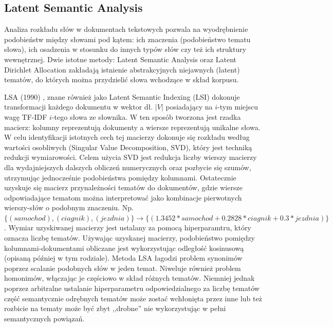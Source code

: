 \documentclass[pl]{minipw} %
\begin{document}
\subsection{Latent Semantic Analysis}
Analiza rozkładu słów w dokumentach tekstowych pozwala na wyodrębnienie podobieństw między słowami pod kątem: ich znaczenia (podobieństwo tematu słowa), ich osadzenia w stosunku do innych typów słów czy też ich struktury wewnętrznej. Dwie istotne metody: Latent Semantic Analysis\cite{lsa} oraz Latent Dirichlet Allocation\cite{lda} zakładają istnienie abstrakcyjnych niejawnych (latent) tematów, do których można przydzielić słowa wchodzące w skład korpusu.

LSA (1990) \cite{lsa}, znane również jako Latent Semantic Indexing (LSI) dokonuje transformacji każdego dokumentu w wektor dł. $|V|$ posiadający na $i$-tym miejscu wagę TF-IDF $i$-tego słowa ze słownika. W ten sposób tworzona jest rzadka macierz: kolumny reprezentują dokumenty a wiersze reprezentują unikalne słowa. W celu identyfikacji istotnych cech tej macierzy dokonuje się rozkładu według wartości osobliwych (Singular Value Decomposition\cite{svd}, SVD), który jest techniką redukcji wymiarowości. Celem użycia SVD jest redukcja liczby wierszy macierzy dla wydajniejszych dalszych obliczeń numerycznych oraz pozbycie się szumów, utrzymując jednocześnie podobieństwa pomiędzy kolumnami. Ostatecznie uzyskuje się macierz przynależności tematów do dokumentów, gdzie wiersze odpowiadające tematom można interpretować jako kombinacje pierwotnych wierszy-słów o podobnym znaczeniu. Np. $\{(samochod), (ciagnik), (jezdnia)\} \to \{(1.3452 * samochod + 0.2828 * ciagnik + 0.3 * jezdnia)\}$. Wymiar uzyskiwanej macierzy jest ustalany za pomocą hiperparamtru, który oznacza liczbę tematów. Używając uzyskanej macierzy, podobieństwo pomiędzy kolumnami-dokumentami obliczane jest wykorzystując odległość kosinusową (opisaną później w tym rodziale). Metoda LSA łagodzi problem synonimów poprzez scalanie podobnych słów w jeden temat. Niweluje również problem homonimów, włączając je częściowo w skład różnych tematów. Niemniej jednak poprzez arbitralne ustalanie hiperparametru odpowiedzialnego za liczbę tematów część semantycznie odrębnych tematów może zostać wchłonięta przez inne lub też rozbicie na tematy może być zbyt ,,drobne'' nie wykorzystując w pełni semantycznych powiązań.

\end{document}
